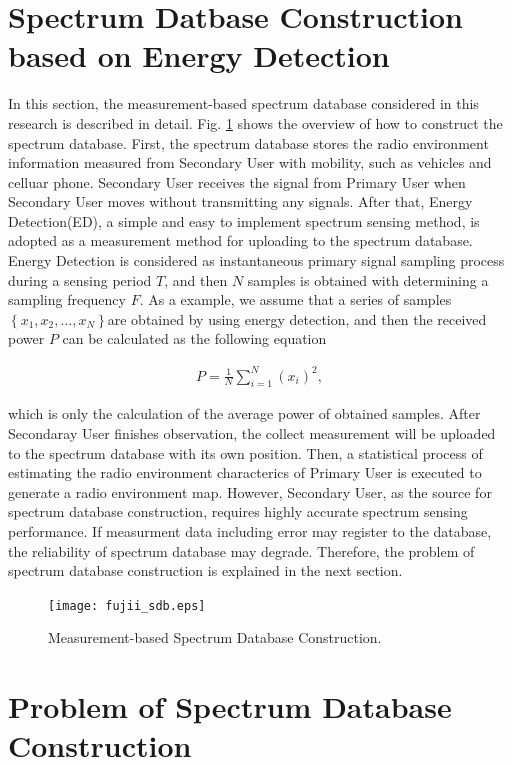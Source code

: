 \section{Spectrum Datbase Construction based on Energy Detection}
In this section, the measurement-based spectrum database considered in this research is described in detail. Fig. \ref{fig:fujii_sdb} shows the overview of how to construct the spectrum database. First, the spectrum database stores the radio environment information measured from Secondary User with mobility, such as vehicles and celluar phone. Secondary User receives the signal from Primary User when Secondary User moves without transmitting any signals. After that, Energy Detection(ED)\cite{ref:ED}, a simple and easy to implement spectrum sensing method, is adopted as a measurement method for uploading to the spectrum database. Energy Detection is considered as instantaneous primary signal sampling process during a sensing period $T$, and then $N$ samples is obtained with determining a sampling frequency $F$. As a example, we assume that a series of samples $\left\{x_1,x_2,...,x_N\right\}$are obtained by using energy detection, and then the received power $P$ can be calculated as the following equation

\begin{eqnarray}
P=\frac{1}{N}\sum_{i=1}^{N}(x_i)^2,
\end{eqnarray}

which is only the calculation of the average power of obtained samples.
After Secondaray User finishes observation, the collect measurement will be uploaded to the spectrum database with its own position. Then, a statistical process of estimating the radio environment characterics of Primary User is executed to generate a radio environment map. However, Secondary User, as the source for spectrum database construction, requires highly accurate spectrum sensing performance. If measurment data including error may register to the database, the reliability of spectrum database may degrade. Therefore, the problem of spectrum database construction is explained in the next section.

\begin{figure}[!htp]
\begin{center}
\texttt{[image: fujii\_sdb.eps]}
\caption{Measurement-based Spectrum Database Construction.}
\label{fig:fujii_sdb}
\end{center}
\end{figure}

\section{Problem of Spectrum Database Construction }
